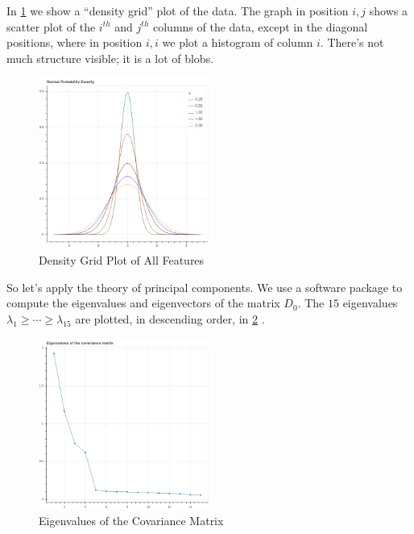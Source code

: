 \documentclass[
  oneside]{scrbook}
\begin{document}
In \cref{fig:densitygrid} we show a ``density grid'' plot of the data.
The graph in position \(i,j\) shows a scatter plot of the \(i^{th}\) and
\(j^{th}\) columns of the data, except in the diagonal positions, where
in position \(i,i\) we plot a histogram of column \(i\). There's not
much structure visible; it is a lot of blobs.

\begin{figure}
\hypertarget{fig:densitygrid}{%
\centering
\includegraphics[width=0.5\textwidth,height=\textheight]{img/density.png}
\caption{Density Grid Plot of All Features}\label{fig:densitygrid}
}
\end{figure}

So let's apply the theory of principal components. We use a software
package to compute the eigenvalues and eigenvectors of the matrix
\(D_{0}\). The \(15\) eigenvalues
\(\lambda_{1}\ge \cdots \ge \lambda_{15}\) are plotted, in descending
order, in \cref{fig:eigenvalues} .

\begin{figure}
\hypertarget{fig:eigenvalues}{%
\centering
\includegraphics[width=0.5\textwidth,height=\textheight]{img/eigenvalues.png}
\caption{Eigenvalues of the Covariance Matrix}\label{fig:eigenvalues}
}
\end{figure}
\end{document}
